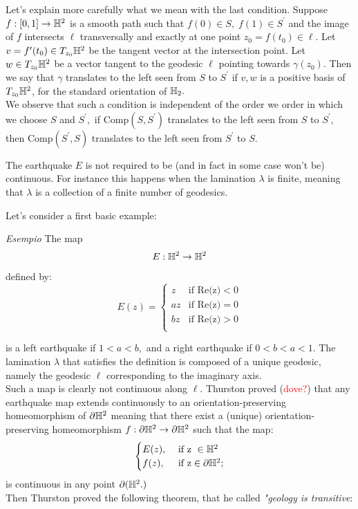 Let's explain more carefully what we mean with the last condition. Suppose $f:[0,1]\to\mathbb{H}^2$ is a smooth path such that $f(0)\in S,\;f(1)\in S^{\prime}$ and the image of $f$ intersects $\ell$ transversally and exactly at one point $z_0=f(t_0)\in\ell.$ Let $v=f^{\prime}(t_0)\in T_{z_0}\mathbb{H}^2$ be the tangent vector at the intersection point. Let $w\in T_{z_0}\mathbb{H}^2$ be a vector tangent to the geodesic $\ell$ pointing towards $\gamma(z_0).$ Then we say that $\gamma$ translates to the left seen from $S$ to $S^{\prime} $ if $v,w$ is a positive basis of $T_{z_0}\mathbb{H}^2$, for the standard orientation of $\mathbb{H}_2.$\\
We observe that such a condition is independent of the order we order in which we choose $S$ and $S^{\prime},$  if $\text{Comp}(S,S^{\prime})$ translates to the left seen from $S$ to $S^{\prime},$ then $\text{Comp}(S^{\prime} ,S)$ translates to the left seen from $S^{\prime} $ to $S.$ 


\begin{observation} The earthquake $E$ is not required to be (and in fact in some case won't be) continuous. For instance this happens when the lamination $\lambda$ is finite, meaning that $\lambda$ is a collection of a finite number of geodesics. 
\end{observation}

Let's consider a first basic example: 

\textit{Esempio} The map 
\[
    E:\mathbb{H}^2\to\mathbb{H}^2
\]

defined by:
\[
  E(z)= \begin{cases}
    z & \text{if Re(z)}<0 \\
    az & \text{if Re(z)}=0 \\
    bz & \text{if Re(z)}>0 \\    
\end{cases}
\]

is a left earthquake if $1<a<b,$ and a right earthquake if $0<b<a<1$. The lamination $\lambda$ that satisfies the definition is composed of a unique geodesic, namely the geodesic $\ell$ corresponding to the imaginary axis. \\
Such a map is clearly not continuous along $\ell$.
Thurston proved (\textcolor{red}{dove?}) that any earthquake map extends continuously to an orientation-preserving homeomorphism of $\partial\mathbb{H}^2$ meaning that there exist a (unique) orientation-preserving homeomorphism $f:\partial\mathbb{H}^2\to\partial\mathbb{H}^2$ such that the map: 
\[
    \begin{cases}
        E(z), &\text{ if z }\in \mathbb{H}^2\\
        f(z), &\text{ if z}\in \partial\mathbb{H}^2  ;\\
        
    \end{cases}
\]
is continuous in any point $\partial(\mathbb{H}^2.)$\\
Then Thurston proved the following theorem, that he called \textit{"geology is transitive}:

